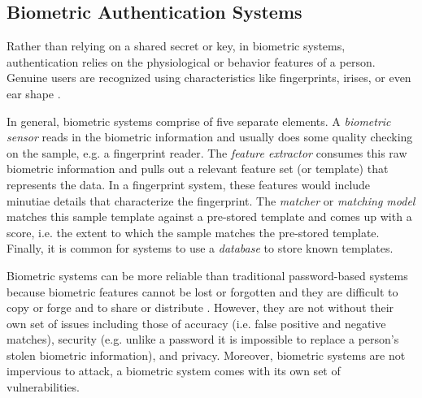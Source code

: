 \documentclass[11pt]{article}
\begin{document}
\subsection{Biometric Authentication Systems}
Rather than relying on a shared secret or key, in biometric systems, 
authentication relies on the physiological or behavior features of a person. 
Genuine users are recognized using characteristics like fingerprints,
irises, or even ear shape \cite{Biocryptography10}. 


In general, biometric systems comprise of five separate elements. A 
\textit{biometric sensor} reads in the biometric information and usually 
does some quality checking on the sample, e.g. a fingerprint reader. The 
\textit{feature extractor} consumes this raw biometric information and pulls 
out a relevant feature set (or template) that represents the data. In a 
fingerprint system, these features would include minutiae details that 
characterize the fingerprint. The \textit{matcher} or \textit{matching model}
matches this sample template against a pre-stored template and comes up with
a score, i.e. the extent to which the sample matches the pre-stored template. Finally, it is common for systems to use a \textit{database} to store known 
templates.

Biometric systems can be more reliable than traditional
password-based systems because biometric features cannot be lost or forgotten
and they are difficult to copy or forge and to share or distribute \cite{Fingerprint07}. However, they are not without their own set of issues including 
those of accuracy (i.e. false positive and negative matches), security (e.g.
unlike a password it is impossible to replace a person's stolen biometric information), and privacy. Moreover, biometric systems are not impervious to 
attack, a biometric system comes with its own set of vulnerabilities.
\end{document}
